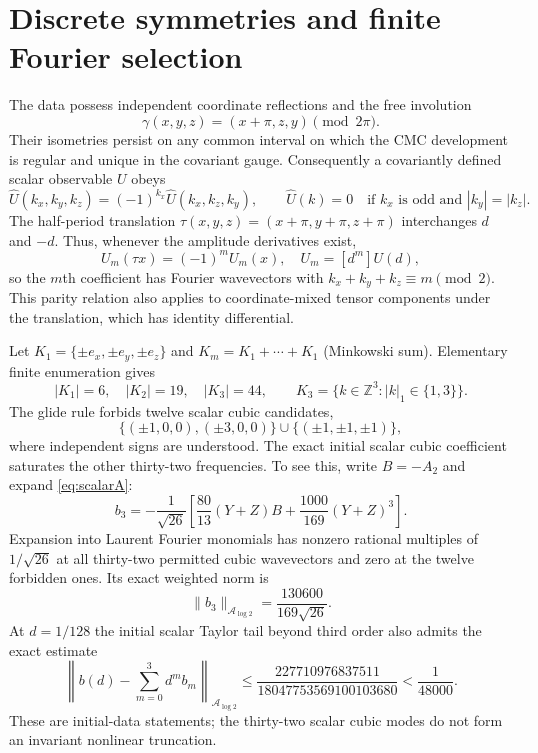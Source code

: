 \documentclass[11pt,a4paper]{article}
\theoremstyle{remark}
\newcommand{\A}{\mathcal A_{\log 2}}
\begin{document}
\section{Discrete symmetries and finite Fourier selection}
The data possess independent coordinate reflections and the free involution
\begin{equation}\label{eq:glide}
\gamma(x,y,z)=(x+\pi,z,y)\pmod{2\pi}.
\end{equation}
Their isometries persist on any common interval on which the CMC development is regular and unique in the covariant gauge. Consequently a covariantly defined scalar observable $U$ obeys
\begin{equation}\label{eq:gliderule}
\widehat U(k_x,k_y,k_z)=(-1)^{k_x}\widehat U(k_x,k_z,k_y),
\qquad
\widehat U(k)=0\quad\text{if $k_x$ is odd and $|k_y|=|k_z|$}.
\end{equation}
The half-period translation $\tau(x,y,z)=(x+\pi,y+\pi,z+\pi)$ interchanges $d$ and $-d$. Thus, whenever the amplitude derivatives exist,
\begin{equation}\label{eq:parity}
U_m(\tau x)=(-1)^m U_m(x),\quad
U_m=[d^m]U(d),
\end{equation}
so the $m$th coefficient has Fourier wavevectors with $k_x+k_y+k_z\equiv m\pmod2$. This parity relation also applies to coordinate-mixed tensor components under the translation, which has identity differential.

Let $K_1=\{\pm e_x,\pm e_y,\pm e_z\}$ and $K_m=K_1+\cdots+K_1$ (Minkowski sum). Elementary finite enumeration gives
\begin{equation}\label{eq:supportsizes}
|K_1|=6,\quad |K_2|=19,\quad |K_3|=44,\qquad
K_3=\{k\in\mathbb Z^3:|k|_1\in\{1,3\}\}.
\end{equation}
The glide rule forbids twelve scalar cubic candidates,
\[
\{(\pm1,0,0),(\pm3,0,0)\}\cup\{(\pm1,\pm1,\pm1)\},
\]
where independent signs are understood. The exact initial scalar cubic coefficient saturates the other thirty-two frequencies. To see this, write $B=-A_2$ and expand \eqref{eq:scalarA}:
\begin{equation}\label{eq:b3}
b_3=-\frac1{\sqrt{26}}\left[\frac{80}{13}(Y+Z)B
+\frac{1000}{169}(Y+Z)^3\right].
\end{equation}
Expansion into Laurent Fourier monomials has nonzero rational multiples of $1/\sqrt{26}$ at all thirty-two permitted cubic wavevectors and zero at the twelve forbidden ones. Its exact weighted norm is
\begin{equation}\label{eq:b3norm}
\|b_3\|_{\A}=\frac{130600}{169\sqrt{26}}.
\end{equation}
At $d=1/128$ the initial scalar Taylor tail beyond third order also admits the exact estimate
\begin{equation}\label{eq:btail}
\left\|b(d)-\sum_{m=0}^3d^mb_m\right\|_{\A}
\leq\frac{227710976837511}{18047753569100103680}<\frac1{48000}.
\end{equation}
These are initial-data statements; the thirty-two scalar cubic modes do not form an invariant nonlinear truncation.
\end{document}
